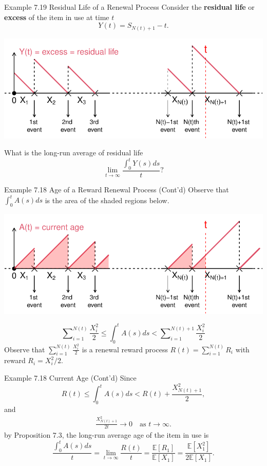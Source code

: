 \documentclass[letterpaper,handout, mathserif]{beamer}
\def\Sum{\sum\nolimits}
\def\E{\mathbb E}
\begin{document}
\begin{frame}{Example 7.19 Residual Life of a Renewal Process}
Consider the {\bf residual life} or {\bf excess} of the item in use at time $t$
$$Y(t) = S_{N(t)+1}- t.$$
\begin{center}
\includegraphics[width=\textwidth]{L17_ResidualLife.pdf}
\end{center}
What is the long-run average of residual life
$$
\lim_{t\to\infty}\frac{\int_0^tY(s)ds}{t}?
$$
\end{frame}
\begin{frame}{Example 7.18 Age of a Reward Renewal Process (Cont'd)}
Observe that $\int_0^tA(s)ds$ is the area of the shaded regions below.
\begin{center}
\includegraphics[width=\textwidth]{L17_CurrentAgeArea.pdf}
\end{center}
$$
\Sum_{i=1}^{N(t)}\frac{X_i^2}{2} \le \int_0^tA(s)ds<\Sum_{i=1}^{N(t)+1}\frac{X_i^2}{2}
$$
Observe that $\sum_{i=1}^{N(t)}\frac{X_i^2}{2}$
is a renewal reward process $R(t) =\sum_{i=1}^{N(t)}R_i$ with reward
$R_i= X_i^2/2$.

\end{frame}
\begin{frame}{Example 7.18 Current Age (Cont'd)}
Since
$$R(t)\le \int_0^tA(s)ds <R(t)+\frac{X_{N(t)+1}^2}{2},$$
and
\begin{align*}
\frac{X_{N(t)+1}^2}{2t}\to 0\quad\text{as }t\to\infty.
\end{align*}
by Proposition 7.3, the long-run average age of the item in use is
$$
\frac{\int_0^tA(s)ds}{t}
= \lim_{t\to\infty}\dfrac{R(t)}{t}
=\dfrac{\E[R_1]}{\E[X_1]}=\frac{\E[X_1^2]}{2\E[X_1]}.
$$
\end{frame}
\end{document}
